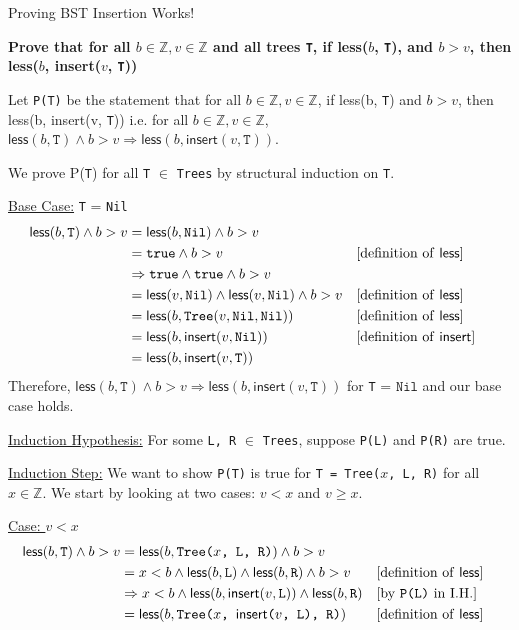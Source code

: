 \documentclass[11pt, nopagenumbers]{adamblan-hw}
\newcommand{\ZZ}{\mathbb{Z}}
\newcommand{\T}[1]{\texttt{#1}}
\newcommand{\Nil}{\texttt{Nil}}
\newcommand{\finsert}{\textsf{insert}}
\newcommand{\fless}{\textsf{less}}
\begin{document}
\begin{question}{\color{red} Proving BST Insertion Works!}
\begin{part} \textbf{Prove that for all $b \in \ZZ, v \in \ZZ$ and all trees \T{T}, if \fless($b$, \T{T}), and $b > v$, then \\\fless($b$, \finsert($v$, \T{T}))}

Let \T{P(T)} be the statement that for all $b \in \ZZ, v \in \ZZ$, if \fless(b, \T{T}) and $b > v$, then
\fless(b, \finsert(v, \T{T})) i.e. for all $b \in \ZZ, v \in \ZZ$, $\fless(b, \T{T}) \land b > v \Rightarrow \fless(b, \finsert(v, \T{T}))$.

We prove P(\T{T}) for all \T{T} $\in$ \T{Trees} by structural induction on \T{T}. 

\underline{Base Case:} \T{T} = \Nil
\begin{align*}
\fless(b, \T{T}) \land b > v  &= \fless(b, \Nil) \land b > v\\
&= \T{true} \land b > v && \text{[definition of \fless]} \\
&\Rightarrow \T{true} \land \T{true} \land b > v \\
&= \fless(v, \Nil) \land \fless(v, \Nil) \land b > v && \text{[definition of \fless]} \\
&= \fless(b, \T{Tree}(v, \Nil, \Nil)) && \text{[definition of \fless]} \\
&= \fless(b, \finsert(v, \Nil)) && \text{[definition of \finsert]} \\
&= \fless(b, \finsert(v, \T{T}))
\end{align*}
Therefore, $\fless(b, \T{T}) \land b > v \Rightarrow \fless(b, \finsert(v, \T{T}))$ for \T{T} = $\Nil$ and our base case holds.

\underline{Induction Hypothesis:} For some \T{L, R} $\in$ \T{Trees}, suppose \T{P(L)} and \T{P(R)} are true.

\underline{Induction Step:} We want to show \T{P(T)} is true for \T{T = Tree($x$, L, R)} for all $x \in \ZZ$. We start by looking at two cases: $v < x$ and $v \geq x$.

\underline{Case: $v < x$}  
\begin{align*}
\fless(b, \T{T}) \land b > v &= \fless(b, \T{Tree($x$, L, R)}) \land b > v\\
&= x < b \land \fless(b, \T{L}) \land \fless(b, \T{R}) \land b > v && \text{[definition of \fless]} \\
&\Rightarrow x < b \land \fless(b, \finsert(v, \T{L})) \land \fless(b, \T{R}) && \text{[by \T{P(L)} in I.H.]} \\
&= \fless(b, \T{Tree($x$, \finsert($v$, \T{L}), R)}) && \text{[definition of \fless]}
\end{align*}


\end{part}
\end{question}
\end{document}
